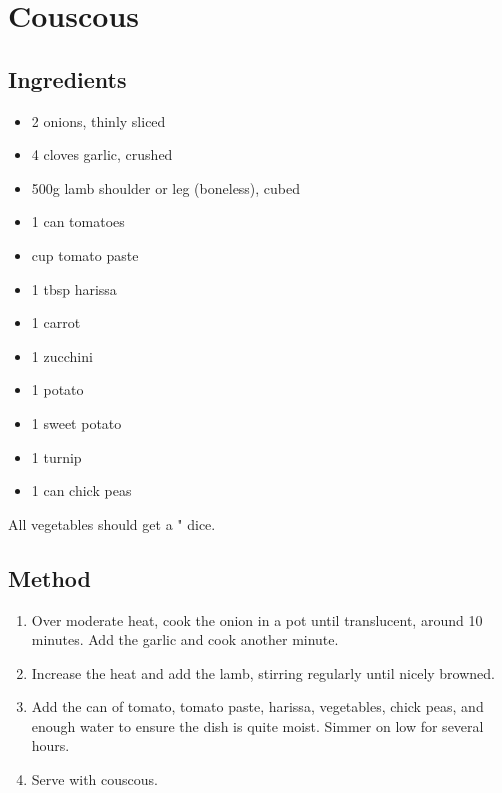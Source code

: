 \section{Couscous}



\subsection{Ingredients}

\begin{itemize}
	\item 2 onions, thinly sliced
	\item 4 cloves garlic, crushed
	\item 500g lamb shoulder or leg (boneless), cubed
	\item 1 can tomatoes
	\item {} cup tomato paste
	\item 1 tbsp harissa
	\item 1 carrot
	\item 1 zucchini
	\item 1 potato
	\item 1 sweet potato
	\item 1 turnip
	\item 1 can chick peas
\end{itemize}

All vegetables should get a " dice.

\subsection{Method}

\begin{enumerate}
	\item Over moderate heat, cook the onion in a pot until translucent, around 10 minutes. Add the garlic and cook another minute.
	\item Increase the heat and add the lamb, stirring regularly until nicely browned.
	\item Add the can of tomato, tomato paste, harissa, vegetables, chick peas, and enough water to ensure the dish is quite moist. Simmer on low for several hours.
	\item Serve with couscous.
\end{enumerate}
